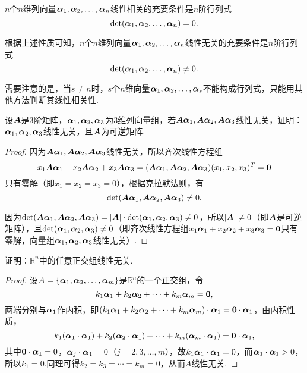 \begin{property}
\def\a#1{\mat{\alpha}_{#1}}
\(n\)个\(n\)维列向量\(\a1,\a2,\dotsc,\a n\)线性相关的充要条件是\(n\)阶行列式\[
\det(\a1,\a2,\dotsc,\a n)=0.
\]
\end{property}
根据上述性质可知，\(n\)个\(n\)维列向量\(\boldsymbol{\alpha}_1,\boldsymbol{\alpha}_2,\dotsc,\boldsymbol{\alpha}_n\)线性无关的充要条件是\(n\)阶行列式\[
\det(\boldsymbol{\alpha}_1,\boldsymbol{\alpha}_2,\dotsc,\boldsymbol{\alpha}_n)\neq0.
\]

需要注意的是，当\(s \neq n\)时，\(s\)个\(n\)维向量\(\boldsymbol{\alpha}_1,\boldsymbol{\alpha}_2,\dotsc,\boldsymbol{\alpha}_s\)不能构成行列式，只能用其他方法判断其线性相关性.

\begin{example}
\def\a#1{\mat{\alpha}_{#1}}
设\(\boldsymbol{A}\)是3阶矩阵，\(\a1,\a2,\a3\)为3维列向量组，若\(\A\a1,\A\a2,\A\a3\)线性无关，证明：\(\a1,\a2,\a3\)线性无关，且\(\boldsymbol{A}\)为可逆矩阵.
\begin{proof}
因为\(\A\a1,\A\a2,\A\a3\)线性无关，所以齐次线性方程组\[
x_1 \A\a1 + x_2 \A\a2 + x_3 \A\a3
= (\A\a1,\A\a2,\A\a3) (x_1,x_2,x_3)^T
= \z
\]只有零解（即\(x_1 = x_2 = x_3 = 0\)），根据克拉默法则，有\[
\det(\A\a1,\A\a2,\A\a3) \neq 0.
\]

因为\(\det(\A\a1,\A\a2,\A\a3) = \abs{\A} \cdot \det(\a1,\a2,\a3) \neq 0\)，所以\(\abs{\boldsymbol{A}} \neq 0\)（即\(\boldsymbol{A}\)是可逆矩阵），且\(\det(\a1,\a2,\a3) \neq 0\)（即齐次线性方程组\(x_1 \a1 + x_2 \a2 + x_3 \a3 = \z\)只有零解，向量组\(\a1,\a2,\a3\)线性无关）.
\end{proof}
\end{example}

\begin{example}
证明：\(\mathbb{R}^n\)中的任意正交组线性无关.
\begin{proof}
\def\a#1{\mat{\alpha}_{#1}}
设\(A=\{\a1,\a2,\dotsc,\a m\}\)是\(\mathbb{R}^n\)的一个正交组，令\[
k_1 \a1 + k_2 \a2 + \dotsb + k_m \a m = \z,
\]两端分别与\(\a1\)作内积，即\(\vectorinnerproduct{(k_1 \a1 + k_2 \a2 + \dotsb + k_m \a m)}{\a1} = \vectorinnerproduct{\z}{\a1}\)，由内积性质，\[
k_1 (\vectorinnerproduct{\a1}{\a1}) + k_2 (\vectorinnerproduct{\a2}{\a1}) + \dotsb + k_m (\vectorinnerproduct{\a m}{\a1}) = \vectorinnerproduct{\z}{\a1},
\]其中\(\vectorinnerproduct{\z}{\a1} = 0\)，\(\vectorinnerproduct{\a j}{\a1} = 0\)（\(j=2,3,\dotsc,m\)），故\(k_1 \vectorinnerproduct{\a1}{\a1} = 0\)，而\(\vectorinnerproduct{\a1}{\a1} > 0\)，所以\(k_1=0\).同理可得\(k_2=k_3=\dotsb=k_m=0\)，从而\(A\)线性无关.
\end{proof}
\end{example}

